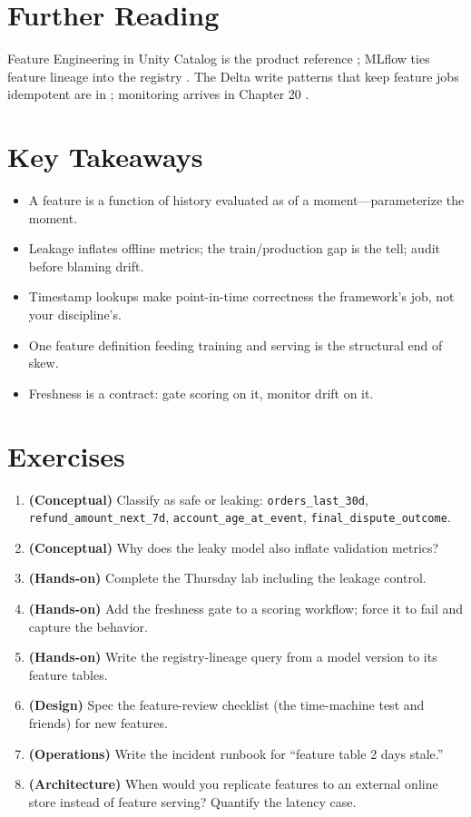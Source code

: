 \section{Further Reading}
Feature Engineering in Unity Catalog is the product reference \cite{databricksFeatureStore}; MLflow ties feature lineage into the registry \cite{databricksMLflow,mlflowDocs}. The Delta write patterns that keep feature jobs idempotent are in \cite{databricksDelta}; monitoring arrives in Chapter 20 \cite{databricksLakehouseMonitoring}.

\section*{Key Takeaways}
\begin{itemize}
    \item A feature is a function of history evaluated as of a moment---parameterize the moment.
    \item Leakage inflates offline metrics; the train/production gap is the tell; audit before blaming drift.
    \item Timestamp lookups make point-in-time correctness the framework's job, not your discipline's.
    \item One feature definition feeding training and serving is the structural end of skew.
    \item Freshness is a contract: gate scoring on it, monitor drift on it.
\end{itemize}

\section{Exercises}
\begin{enumerate}
    \item \textbf{(Conceptual)} Classify as safe or leaking: \texttt{orders\_last\_30d}, \texttt{refund\_amount\_next\_7d}, \texttt{account\_age\_at\_event}, \texttt{final\_dispute\_outcome}.
    \item \textbf{(Conceptual)} Why does the leaky model also inflate validation metrics?
    \item \textbf{(Hands-on)} Complete the Thursday lab including the leakage control.
    \item \textbf{(Hands-on)} Add the freshness gate to a scoring workflow; force it to fail and capture the behavior.
    \item \textbf{(Hands-on)} Write the registry-lineage query from a model version to its feature tables.
    \item \textbf{(Design)} Spec the feature-review checklist (the time-machine test and friends) for new features.
    \item \textbf{(Operations)} Write the incident runbook for ``feature table 2 days stale.''
    \item \textbf{(Architecture)} When would you replicate features to an external online store instead of feature serving? Quantify the latency case.
\end{enumerate}
